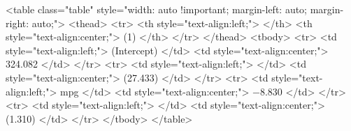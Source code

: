 <table class="table" style="width: auto !important; margin-left: auto; margin-right: auto;">
 <thead>
  <tr>
   <th style="text-align:left;">   </th>
   <th style="text-align:center;"> (1) </th>
  </tr>
 </thead>
<tbody>
  <tr>
   <td style="text-align:left;"> (Intercept) </td>
   <td style="text-align:center;"> 324.082 </td>
  </tr>
  <tr>
   <td style="text-align:left;">  </td>
   <td style="text-align:center;"> (27.433) </td>
  </tr>
  <tr>
   <td style="text-align:left;"> mpg </td>
   <td style="text-align:center;"> −8.830 </td>
  </tr>
  <tr>
   <td style="text-align:left;">  </td>
   <td style="text-align:center;"> (1.310) </td>
  </tr>
</tbody>
</table>
